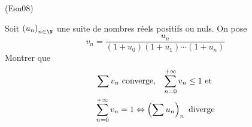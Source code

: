 \begin{tiny}(Esn08)\end{tiny} Soit $\left( u_n\right)_{n\in \N}$ une suite de nombres réels positifs ou nuls. On pose
\begin{displaymath}
  v_n = \frac{u_n}{(1+u_0)(1+u_1)\cdots(1+u_n)}
\end{displaymath}
Montrer que 
\begin{align*}
\sum v_n \text{ converge}, \hspace{0.3cm}  
\sum_{n=0}^{+\infty} v_n \leq 1 \text{ et } \\
 \sum_{n=0}^{+\infty} v_n = 1 \Leftrightarrow \left( \sum u_n \right)_n \text{ diverge}
\end{align*}
